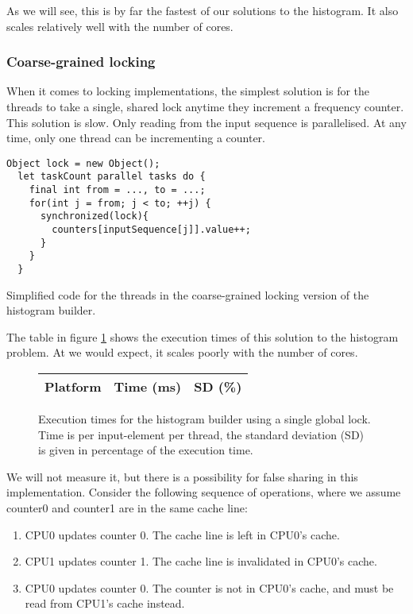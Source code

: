 As we will see, this is by far the fastest of our solutions to the histogram. It
also scales relatively well with the number of cores.

\subsubsection{Coarse-grained locking}
When it comes to locking implementations, the simplest solution is for the
threads to take a single, shared lock anytime they increment a frequency
counter. This solution is slow. Only reading from the input sequence is
parallelised. At any time, only one thread can be incrementing a counter.

\begin{code}
\begin{Verbatim}[frame=single]
  Object lock = new Object();
  let taskCount parallel tasks do {
    final int from = ..., to = ...;
    for(int j = from; j < to; ++j) {
      synchronized(lock){
        counters[inputSequence[j]].value++;
      }
    }
  }
\end{Verbatim}
	\caption{Simplified code for the threads in the coarse-grained locking
	version of the histogram builder.}
\end{code}

The table in figure \ref{table:histo-global} shows the execution times of this
solution to the histogram problem. At we would expect, it scales poorly with the number of cores.

\begin{figure}[hbtp]
	\centering
	\begin{tabular}{l r r}
		\hline
		\hline
		Platform & Time (ms) & SD (\%) \\
		\hline
		
		\hline
		\hline
	\end{tabular}
	\caption{Execution times for the histogram builder using a single
global lock. Time is per input-element per thread, the standard deviation (SD)
is given in percentage of the execution time.}
	\label{table:histo-global}
\end{figure}

We will not measure it, but there is a possibility for false sharing in this
implementation. Consider the following sequence of operations, where we assume
counter0 and counter1 are in the same cache line:

\begin{enumerate}
	\item CPU0 updates counter 0. The cache line is left in CPU0's cache.
	\item \label{list:invalidation} CPU1 updates counter 1. The cache line is invalidated in CPU0's
		cache.
	\item \label{list:unneededread} CPU0 updates counter 0. The counter is not in CPU0's cache, and
		must be read from CPU1's cache instead.
\end{enumerate}

